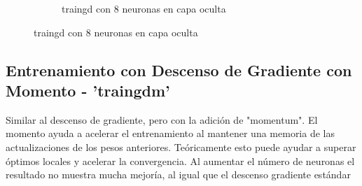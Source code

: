 \documentclass[a4paper, 12pt]{article}
\begin{document}
\begin{figure}[htp!]
\begin{subfigure}{0.49\textwidth}
                        \caption{traingd con 8 neuronas en capa oculta}
                    \end{subfigure}
                \end{figure}
                
            \subsection{Entrenamiento con Descenso de Gradiente con Momento - 'traingdm' }
                Similar al descenso de gradiente, pero con la adición de "momentum". El momento ayuda a acelerar el entrenamiento al mantener una memoria de las actualizaciones de los pesos anteriores. Teóricamente esto puede ayudar a superar óptimos locales y acelerar la convergencia. Al aumentar el número de neuronas el resultado no muestra mucha mejoría, al igual que el descenso gradiente estándar
\end{document}
